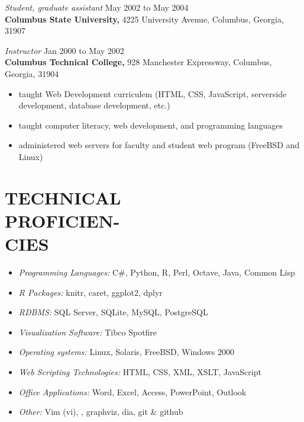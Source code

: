 \documentclass[margin, 10pt]{res} %
\begin{document}
\begin{resume}
{\it Student, graduate assistant} \hfill May 2002 to May 2004 \\
\textbf{Columbus State University,} 4225 University Avenue, Columbus, Georgia, 31907


{\it Instructor} \hfill Jan 2000 to May 2002 \\
\textbf{Columbus Technical College,} 928 Manchester Expressway, Columbus, Georgia, 31904

\begin{itemize} \itemsep -2pt %
        \item taught Web Development curriculem (HTML, CSS, JavaScript, serverside development, database development, etc.)
\item taught computer literacy, web development, and programming languages
\item administered web servers for faculty and student web program (FreeBSD and Linux)
\end{itemize}


\section{TECHNICAL\\ PROFICIEN-\\ CIES}

\begin{itemize} \itemsep -2pt %

\item {\it Programming Languages:} C\#, Python,  \textsf{R}, Perl, Octave, Java, Common Lisp
\item {\it \textsf{R} Packages:} knitr, caret, ggplot2, dplyr
\item {\it RDBMS:} SQL Server, SQLite, MySQL, PostgreSQL
\item {\it Visualization Software:} Tibco Spotfire
\item {\it Operating systems:} Linux, Solaris, FreeBSD, Windows 2000
\item {\it Web Scripting Technologies:} HTML, CSS, XML, XSLT, JavaScript
\item {\it Office Applications:} Word, Excel, Access, PowerPoint, Outlook
\item {\it Other:} Vim (vi), \LaTeXe, graphviz, dia, git \& github
\end{itemize}


\end{resume}
\end{document}
